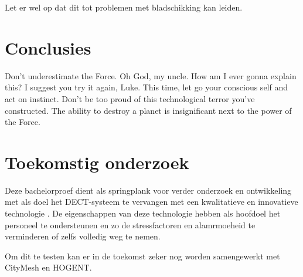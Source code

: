 \documentclass[a0,portrait]{hogent-poster}
\begin{document}
\begin{multicols}{2}
Let er wel op dat dit tot problemen met bladschikking kan leiden.

\section{Conclusies}

Don't underestimate the Force. Oh God, my uncle. How am I ever gonna explain this? I suggest you try it again, Luke. This time, let go your conscious self and act on instinct. Don't be too proud of this technological terror you've constructed. The ability to destroy a planet is insignificant next to the power of the Force.

\section{Toekomstig onderzoek}

Deze bachelorproef dient als springplank voor verder onderzoek en ontwikkeling met als doel het DECT-systeem te vervangen met een kwalitatieve en innovatieve technologie . De eigenschappen van deze technologie hebben als hoofdoel het personeel te ondersteunen en zo de stressfactoren en alamrmoeheid te verminderen of zelfs volledig weg te nemen.

Om dit te testen kan er in de toekomst zeker nog worden samengewerkt met CityMesh en HOGENT. 

\end{multicols}
\end{document}
